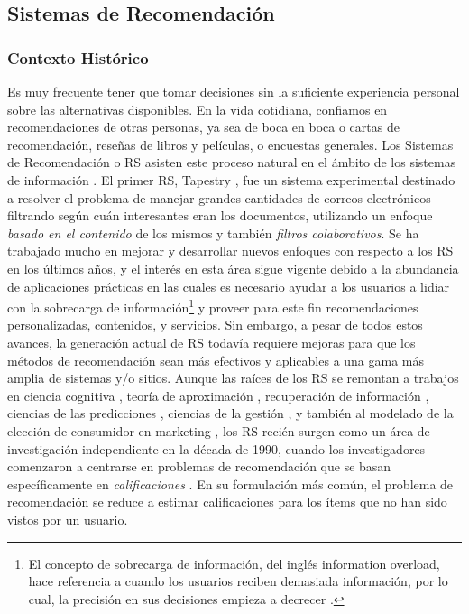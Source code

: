 \subsection{Sistemas de Recomendación}
\subsubsection{Contexto Histórico}
Es muy frecuente tener que tomar decisiones sin la suficiente experiencia personal sobre las alternativas disponibles. En la vida cotidiana, confiamos en recomendaciones de otras personas, ya sea de boca en boca o cartas de recomendación, reseñas de libros y películas, o encuestas generales. Los Sistemas de Recomendación o RS asisten este proceso natural en el ámbito de los sistemas de información \citep{resnick1997recommender}. El primer RS, Tapestry \citep{goldberg1992using}, fue un sistema experimental destinado a resolver el problema de manejar grandes cantidades de correos electrónicos filtrando según cuán interesantes eran los documentos, utilizando un enfoque \textit{basado en el contenido} de los mismos y también \textit{filtros colaborativos}. Se ha trabajado mucho en mejorar y desarrollar nuevos enfoques con respecto a los RS en los últimos años, y el interés en esta área sigue vigente debido a la abundancia de aplicaciones prácticas en las cuales es necesario ayudar a los usuarios a lidiar con la sobrecarga de información\footnote{El concepto de sobrecarga de información, del inglés information overload, hace referencia a cuando los usuarios reciben demasiada información, por lo cual, la precisión en sus decisiones empieza a decrecer \citep{eppler2004concept}.} y proveer para este fin recomendaciones personalizadas, contenidos, y servicios. Sin embargo, a pesar de todos estos avances, la generación actual de RS todavía requiere mejoras para que los métodos de recomendación sean más efectivos y aplicables a una gama más amplia de sistemas y/o sitios. Aunque las raíces de los RS se remontan a trabajos en ciencia cognitiva \citep{rich1979user}, teoría de aproximación \citep{powell1981approximation}, recuperación de información \citep{salton1989automatic}, ciencias de las predicciones \citep{armstrong2001principles}, ciencias de la gestión \citep{murthi2003role}, y también al modelado de la elección de consumidor en marketing \citep{lilien1992marketing}, los RS recién surgen como un área de investigación independiente en la década de 1990, cuando los investigadores comenzaron a centrarse en problemas de recomendación que se basan específicamente en \textit{calificaciones} \citep{adomavicius2005toward}. En su formulación más común, el problema de recomendación se reduce a estimar calificaciones para los ítems que no han sido vistos por un usuario.

